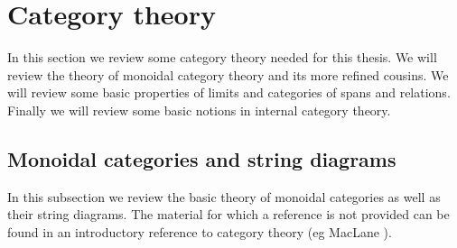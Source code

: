 
\section{Category theory}
\label{sec:cat}

In this section we review some category theory needed for this thesis. We will review the theory of monoidal category theory and its more refined cousins. We will review some basic properties of limits and categories of spans and relations.  Finally we will review some basic notions in internal category theory.

\subsection{Monoidal categories and string diagrams}
\label{subsec:moncat}

In this subsection we review the basic theory of monoidal categories as well as their string diagrams.   The material for which a reference is not provided can be found in an introductory reference to category theory (eg MacLane \cite{maclane}).

